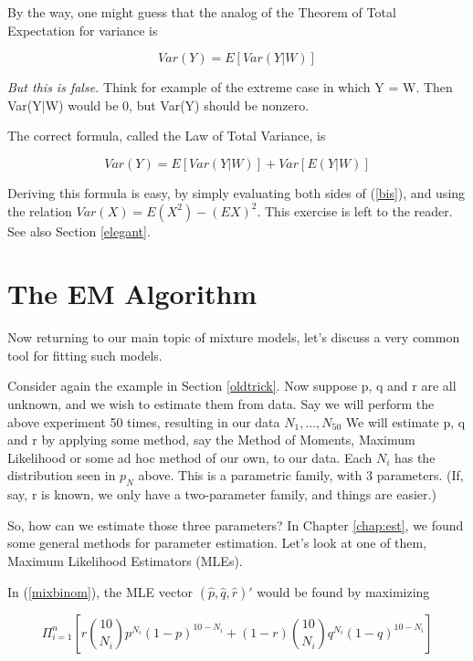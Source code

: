 \documentclass[11pt]{article}
\begin{document}
By the way, one might guess that the analog of the Theorem of Total Expectation
for variance is

\begin{equation}
Var(Y)=E[Var(Y|W)]
\end{equation}

\textit{But this is false.} Think for example of the extreme case in which Y
= W. Then Var(Y$|$W) would be 0, but Var(Y) should be nonzero.

The correct formula, called the Law of Total Variance, is

\begin{equation}
\label{bis}
Var(Y)=E[Var(Y|W)]+Var[E(Y|W)]
\end{equation}

Deriving this formula is easy, by simply evaluating both sides of
(\ref{bis}), and using the relation $Var(X) = E(X^2) -(EX)^2$. This
exercise is left to the reader.  See also Section \ref{elegant}.

\section{The EM Algorithm}
\label{emalg}

Now returning to our main topic of mixture models, let's discuss a very
common tool for fitting such models.

Consider again the example in Section \ref{oldtrick}.  Now suppose p, q
and r are all unknown, and we wish to estimate them from data. Say we
will perform the above experiment 50 times, resulting in our data
$N_1,...,N_{50}$ We will estimate p, q and r by applying some method,
say the Method of Moments, Maximum Likelihood or some ad hoc method of
our own, to our data. Each $N_i$ has the distribution seen in $p_N$
above. This is a parametric family, with 3 parameters. (If, say, r is
known, we only have a two-parameter family, and things are easier.)

So, how can we estimate those three parameters?  In Chapter
\ref{chap:est}, we found some general methods for parameter estimation.
Let's look at one of them, Maximum Likelihood Estimators (MLEs).

In (\ref{mixbinom}), the MLE vector 
$(\widehat{p},
  \widehat{q},
  \widehat{r})'$
would be found by maximizing

\begin{equation}
\Pi_{i=1}^n
\left [ r \binom{10}{N_i} p^{N_i} (1-p)^{10-N_i} +
(1-r) \binom{10}{N_i} q^{N_i} (1-q)^{10-N_i}
\right ]
\end{equation}
\end{document}

